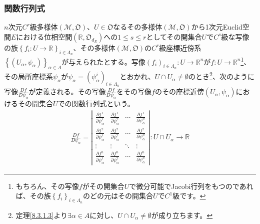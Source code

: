 \documentclass[dvipdfmx]{jsarticle}
\begin{document}
\subsubsection{関数行列式}
\begin{dfn}
$n$次元$C^{r}$級多様体$\left( \mathcal{M},\mathfrak{O} \right)$、$U \in \mathfrak{O}$なるその多様体$\left( \mathcal{M},\mathfrak{O} \right)$から1次元Euclid空間$E$における位相空間$\left( \mathbb{R},\mathfrak{O}_{d_{E}} \right)$への$1\leq s \leq r$としてその開集合$U$で$C^{s}$級な写像の族$\left\{ f_i :U \rightarrow \mathbb{R} \right\}_{i\in \varLambda_n } $、その多様体$\left( \mathcal{M},\mathfrak{O} \right)$の$C^{r}$級座標近傍系$\left\{ \left( U_{\alpha},\psi_{\alpha} \right) \right\}_{\alpha \in A}$が与えられたとする。写像$\left( f_i \right)_{i\in \varLambda_n } :U \rightarrow \mathbb{R}^n $が$f:U \rightarrow \mathbb{R}^n $\footnote{もちろん、その写像$f$がその開集合$U$で微分可能でJacobi行列をもつのであれば、その族$\left\{ f_i \right\}_{i\in \varLambda_n } $のどの元はその開集合$U$で$C^1$級です。}、その局所座標系$\psi_\alpha $が$\psi_\alpha =\left( \psi_\alpha^i \right)_{i\in \varLambda_n }$とおかれ、$U\cap U_\alpha \ne \emptyset $のとき\footnote{定理\ref{8.3.1.3}より$\exists \alpha \in A$に対し、$U\cap U_\alpha \ne \emptyset $が成り立ちます。}、次のように写像$\frac{Df}{D\psi_\alpha }$が定義される。その写像$\frac{Df}{D\psi_\alpha }$をその写像$f$のその座標近傍$\left(U_\alpha ,\psi_\alpha \right)$におけるその開集合$U$での関数行列式という。
\begin{align*}
\frac{Df}{D\psi_\alpha } =\left| \begin{matrix}
  \frac{\partial f^1 }{\partial \psi_\alpha^1 } & \frac{\partial f^1 }{\partial \psi_\alpha^2 } & \cdots & \frac{\partial f^1 }{\partial \psi_\alpha^n } \\
  \frac{\partial f^2 }{\partial \psi_\alpha^1 } & \frac{\partial f^2 }{\partial \psi_\alpha^2 } & \cdots & \frac{\partial f^2 }{\partial \psi_\alpha^n } \\
  \vdots & \vdots & \ddots & \vdots \\
  \frac{\partial f^n }{\partial \psi_\alpha^1 } & \frac{\partial f^n }{\partial \psi_\alpha^2 } & \cdots & \frac{\partial f^n }{\partial \psi_\alpha^n }
\end{matrix} \right| :U\cap U_\alpha \rightarrow \mathbb{R}
\end{align*}
\end{dfn}
\end{document}
